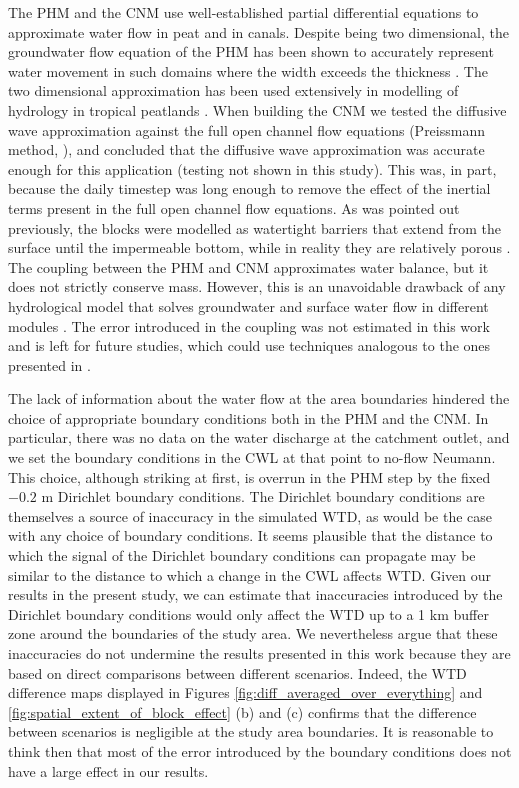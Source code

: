 \documentclass[bg, manuscript]{copernicus}
\begin{document}
The PHM and the CNM use well-established partial differential equations to approximate water flow in peat and in canals.
Despite being two dimensional, the groundwater flow equation of the PHM has been shown to accurately represent water movement in such domains where the width exceeds the thickness \citep{connortonDoesRegionalGroundwaterflow1985}.
The two dimensional approximation has been used extensively in modelling of hydrology in tropical peatlands \citep{bairdDigiBogPeatlandDevelopment2012, cobbHowTemporalPatterns2017}.
When building the CNM we tested the diffusive wave approximation against the full open channel flow equations (Preissmann method, \cite{cungePracticalAspectsComputational1980, haahtiUnsteadyFlowSimulation2014}), and concluded that the diffusive wave approximation was accurate enough for this application (testing not shown in this study). 
This was, in part, because the daily timestep was long enough to remove the effect of the inertial terms present in the full open channel flow equations.
As was pointed out previously, the blocks were modelled as watertight barriers that extend from the surface until the impermeable bottom, while in reality they are relatively porous \citep{osakiTropicalPeatlandEcosystems2016, ritzemaCanalBlockingStrategies2014}.
The coupling between the PHM and CNM approximates water balance, but it does not strictly conserve mass.
However, this is an unavoidable drawback of any hydrological model that solves groundwater and surface water flow in different modules \citep{barthelGroundwaterSurfaceWater2016}. 
The error introduced in the coupling was not estimated in this work and is left for future studies, which could use techniques analogous to the ones presented in \cite{gasda2011}.

The lack of information about the water flow at the area boundaries hindered the choice of appropriate boundary conditions both in the PHM and the CNM.
In particular, there was no data on the water discharge at the catchment outlet, and we set the boundary conditions in the CWL at that point to no-flow Neumann.
This choice, although striking at first, is overrun in the PHM step by the fixed $-0.2$ \unit{m} Dirichlet boundary conditions.
The   Dirichlet boundary conditions are themselves a source of inaccuracy in the simulated WTD, as would be the case with any choice of boundary conditions.
It seems plausible that the  distance to which the signal of the Dirichlet boundary conditions can propagate may be similar to the distance to which a change in the CWL affects WTD.
Given our results in the present study, we can estimate that inaccuracies introduced by the Dirichlet boundary conditions would only affect the WTD up to a 1 km buffer zone around the boundaries of the study area.
We nevertheless argue that these inaccuracies do not undermine the results presented in this work because they are based on direct comparisons between different scenarios.
Indeed, the WTD difference maps displayed in Figures \ref{fig:diff_averaged_over_everything} and \ref{fig:spatial_extent_of_block_effect} (b) and (c) confirms that the difference between scenarios is negligible at the study area boundaries.
It is reasonable to think then that most of the error introduced by the boundary conditions does not have a large effect in our results.
\end{document}
